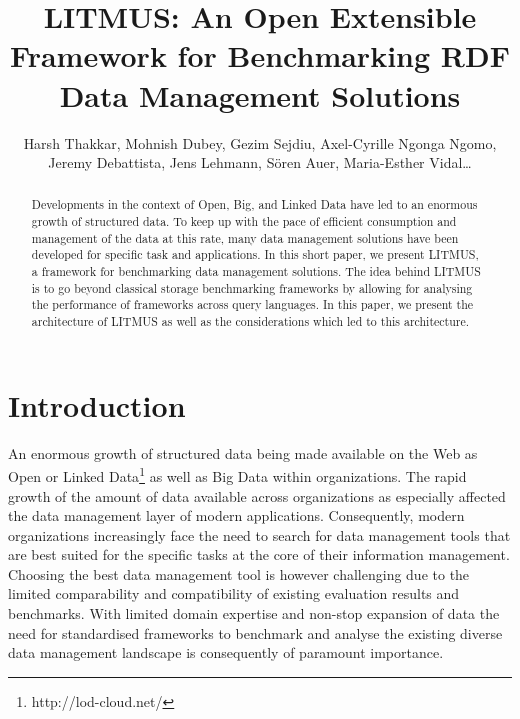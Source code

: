 \documentclass{llncs}
\begin{document}
\title{LITMUS: An Open Extensible Framework for Benchmarking RDF Data Management Solutions}


\author{Harsh Thakkar, Mohnish Dubey, Gezim Sejdiu, Axel-Cyrille Ngonga Ngomo, Jeremy Debattista, Jens Lehmann, S\"{o}ren Auer, Maria-Esther Vidal\dots}
\maketitle

\begin{abstract}
Developments in the context of Open, Big, and Linked Data have led to an enormous growth of structured data. 
To keep up with the pace of efficient consumption and management of the data at this rate, many data management solutions have been developed for specific task and applications.
In this short paper, we present LITMUS, a framework for benchmarking data management solutions. The idea behind LITMUS is to go beyond classical storage benchmarking frameworks by allowing for analysing the performance of frameworks across query languages. In this paper, we present the architecture of LITMUS as well as the considerations which led to this architecture.
\end{abstract}

\section{Introduction}\label{sec:Introduction}
     
An enormous growth of structured data being made available on the Web as Open or Linked Data\footnote{http://lod-cloud.net/} as well as Big Data within organizations. 
The rapid growth of the amount of data available across organizations as especially affected the data management layer of modern applications. Consequently,
modern organizations increasingly face the need to search for data management tools that are best suited for the specific tasks at the core of their information management. 
Choosing the best data management tool is however challenging due to the limited comparability and compatibility of existing evaluation results and benchmarks. 
With limited domain expertise and non-stop expansion of data the need for standardised frameworks to benchmark and analyse the existing diverse data management landscape is consequently of paramount importance.
\end{document}
